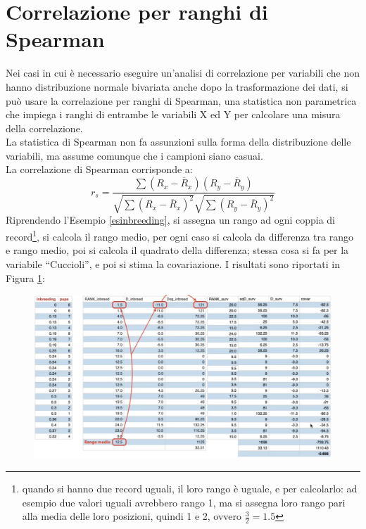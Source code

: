 \documentclass[10pt, draft]{book}
\begin{document}
\section{Correlazione per ranghi di Spearman}

Nei casi in cui è necessario eseguire un'analisi di correlazione per variabili che non hanno distribuzione normale bivariata anche dopo la trasformazione dei dati, si può usare la correlazione per ranghi di Spearman, una statistica non parametrica che impiega i ranghi di entrambe le variabili X ed Y per calcolare una misura della correlazione.\\
La statistica di Spearman non fa assunzioni sulla forma della distribuzione delle variabili, ma assume comunque che i campioni siano casuai.\\
La correlazione di Spearman corrisponde a:
\begin{equation}
    r_s = \frac{\sum{(R_x-\overline{R}_x)(R_y-\overline{R}_y)}}{\sqrt{\sum{(R_x-\overline{R}_x)^2}}\sqrt{\sum{(R_y-\overline{R}_y)^2}}}
\end{equation}
Riprendendo l'Esempio \ref{esinbreeding}, si assegna un rango ad ogni coppia di record\footnote{quando si hanno due record uguali, il loro rango è uguale, e per calcolarlo: ad esempio due valori uguali avrebbero rango 1, ma si assegna loro rango pari alla media delle loro posizioni, quindi 1 e 2, ovvero $\frac{3}{2} = 1.5$}, si calcola il rango medio, per ogni caso si calcola da differenza tra rango e rango medio, poi si calcola il quadrato della differenza; stessa cosa si fa per la variabile ``Cuccioli'', e poi si stima la covariazione. I risultati sono riportati in Figura \ref{figtabinbreeding}:
\begin{figure}[H]
    \centering
    \includegraphics[width=\textwidth]{figtabinbreeding}
    \caption{\small{}}
    \label{figtabinbreeding}
\end{figure}
\end{document}
